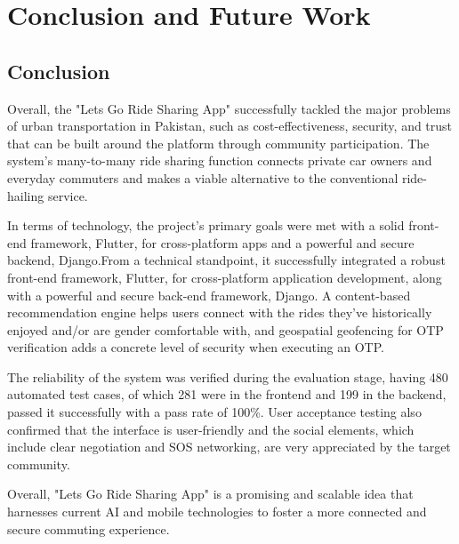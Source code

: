 
\chapter{Conclusion and Future Work}
\justifying


\section{Conclusion}

Overall, the "Lets Go Ride Sharing App" successfully tackled the major problems of urban transportation in Pakistan, such as cost-effectiveness, security, and trust that can be built around the platform through community participation. The system's many-to-many ride sharing function connects private car owners and everyday commuters and makes a viable alternative to the conventional ride-hailing service.

In terms of technology, the project's primary goals were met with a solid front-end framework, Flutter, for cross-platform apps and a powerful and secure backend, Django.From a technical standpoint, it successfully integrated a robust front-end framework, Flutter, for cross-platform application development, along with a powerful and secure back-end framework, Django. A content-based recommendation engine helps users connect with the rides they've historically enjoyed and/or are gender comfortable with, and geospatial geofencing for OTP verification adds a concrete level of security when executing an OTP.

The reliability of the system was verified during the evaluation stage, having 480 automated test cases, of which 281 were in the frontend and 199 in the backend, passed it successfully with a pass rate of 100\%. User acceptance testing also confirmed that the interface is user-friendly and the social elements, which include clear negotiation and SOS networking, are very appreciated by the target community.

Overall, "Lets Go Ride Sharing App" is a promising and scalable idea that harnesses current AI and mobile technologies to foster a more connected and secure commuting experience.


